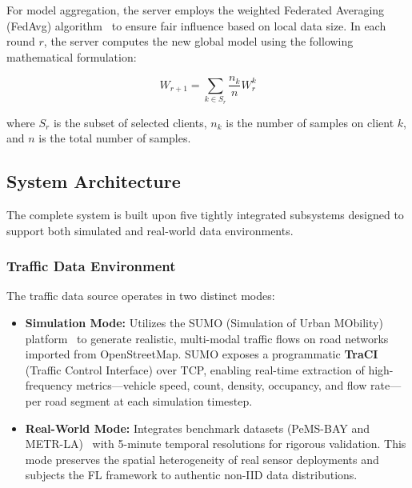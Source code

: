 \documentclass[pdflatex,sn-mathphys-num]{sn-jnl}
\theoremstyle{thmstyleone}
\theoremstyle{thmstyletwo}
\theoremstyle{thmstylethree}
\begin{document}
For model aggregation, the server employs the weighted Federated Averaging
(FedAvg) algorithm~\cite{mcmahan2017fedavg} to ensure fair influence based on
local data size. In each round $r$, the server computes the new global model
using the following mathematical formulation:

\begin{equation}
    W_{r+1} = \sum_{k \in S_r} \frac{n_k}{n} W_r^k
    \label{eq:fedavg}
\end{equation}

\noindent where $S_r$ is the subset of selected clients, $n_k$ is the number of
samples on client $k$, and $n$ is the total number of samples.

\subsection{System Architecture}

The complete system is built upon five tightly integrated subsystems designed to
support both simulated and real-world data environments.

\subsubsection{Traffic Data Environment}

The traffic data source operates in two distinct modes:

\begin{itemize}
    \item \textbf{Simulation Mode:} Utilizes the SUMO (Simulation of Urban
    MObility) platform~\cite{lopez2018sumo} to generate realistic, multi-modal
    traffic flows on road networks imported from OpenStreetMap. SUMO exposes a
    programmatic \textbf{TraCI} (Traffic Control Interface) over TCP, enabling
    real-time extraction of high-frequency metrics---vehicle speed, count,
    density, occupancy, and flow rate---per road segment at each simulation
    timestep.

    \item \textbf{Real-World Mode:} Integrates benchmark datasets (PeMS-BAY and
    METR-LA)~\cite{li2018dcrnn} with 5-minute temporal resolutions for rigorous
    validation. This mode preserves the spatial heterogeneity of real sensor
    deployments and subjects the FL framework to authentic non-IID data
    distributions.
\end{itemize}
\end{document}
